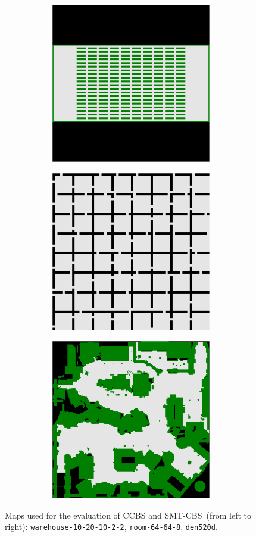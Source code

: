 \documentclass[review]{elsarticle}
\newcommand{\ccbs}{\ac{CCBS}\xspace}
\newcommand{\smtcbs}{SMT-CBS\xspace}
\begin{document}
\begin{figure}[t]
\centering
\begin{subfigure}
    \centering
    \begin{subfigure}
        \centering
        \includegraphics[width=0.3\linewidth]{gridmap-warehouse-10-20-10-2-2.pdf}
    \end{subfigure}\hspace{0.025\linewidth}%
    \begin{subfigure}
        \centering
        \includegraphics[width=0.3\linewidth]{gridmap-room-64-64-8.pdf}
    \end{subfigure}\hspace{0.025\linewidth}%
    \begin{subfigure}
        \centering
        \includegraphics[width=0.3\linewidth]{gridmap-den520d.pdf}
    \end{subfigure}%
\end{subfigure}
\caption{Maps used for the evaluation of \ccbs and \smtcbs~(from left to right): \texttt{warehouse-10-20-10-2-2}, \texttt{room-64-64-8}, \texttt{den520d}.}
\label{fig:gridmaps}
\end{figure}
\end{document}

